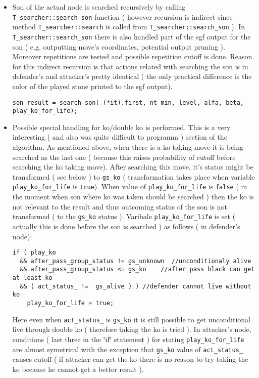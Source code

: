 \begin{itemize}
\item Son of the actual node is searched recursively by calling {\tt T\_\-searcher::search\_\-son} function ( however recursion is indirect since method {\tt T\_\-searcher::search} is called from {\tt T\_\-searcher::search\_\-son} ). In {\tt T\_\-searcher::search\_\-son} there is also handled part of the sgf output for the son ( e.g. outputting move's coordinates, potential output pruning ). Moreover repetitions are tested and possible repetition cutoff is done. Reason for this indirect recursion is that actions related with searching the son is in defender's and attacker's pretty identical ( the only practical difference is the color of the played stone printed to the sgf output). 

\footnotesize\begin{verbatim}son_result = search_son( (*it).first, nt_min, level, alfa, beta, play_ko_for_life);
\end{verbatim}
\normalsize
\end{itemize}


\begin{itemize}
\item Possible special handling for ko/double ko is performed. This is a very interesting ( and also was quite difficult to programm ) section of the algorithm. As mentioned above, when there is a ko taking move it is being searched as the last one ( because this raises probability of cutoff before searching the ko taking move). After searching this move, it's status might be transformed ( see below ) to {\tt gs\_\-ko} ( transformation takes place when variable {\tt play\_\-ko\_\-for\_\-life} is {\tt true}). When value of {\tt play\_\-ko\_\-for\_\-life} is {\tt false} ( in the moment when son where ko was taken should be searched ) then the ko is not relevant to the result and thus outcoming status of the son is not transformed ( to the {\tt gs\_\-ko} status ). Varibale {\tt play\_\-ko\_\-for\_\-life} is set ( actually this is done before the son is searched ) as follows ( in defender's node): 

\footnotesize\begin{verbatim}if ( play_ko 
  && after_pass_group_status != gs_unknown  //unconditionaly alive
  && after_pass_group_status <= gs_ko    //after pass black can get at least ko
  && ( act_status_ !=  gs_alive ) ) //defender cannot live without ko 
    play_ko_for_life = true;
\end{verbatim}
\normalsize
 Here even when {\tt act\_\-status\_\-} is {\tt gs\_\-ko} it is still possible to get unconditional live through double ko ( therefore taking the ko is tried ). In attacker's node, conditions ( last three in the \char`\"{}if\char`\"{} statement ) for stating {\tt play\_\-ko\_\-for\_\-life} are almost symetrical with the exception that {\tt gs\_\-ko} value of {\tt act\_\-status\_\-} causes cutoff ( if attacker can get the ko there is no reason to try taking the ko because he cannot get a better result ).\end{itemize}


